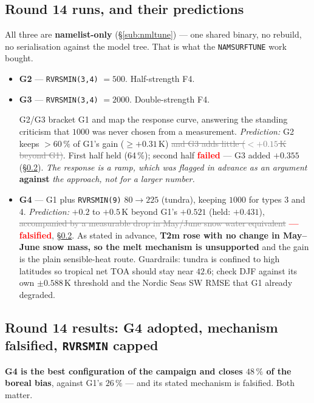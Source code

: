 \documentclass[10pt]{article}
\newcommand{\dead}[1]{\textcolor{gray}{\sout{#1}}}
\begin{document}
\subsection{Round 14 runs, and their predictions}\label{sub:r14runs}
All three are \textbf{namelist-only} (\S\ref{sub:nmltune}) --- one shared binary, no rebuild,
no serialisation against the model tree. That is what the \texttt{NAMSURFTUNE} work bought.

\begin{itemize}\itemsep3pt
\item \textbf{G2} --- \texttt{RVRSMIN(3,4)} $=500$. Half-strength F4.
\item \textbf{G3} --- \texttt{RVRSMIN(3,4)} $=2000$. Double-strength F4.

  G2/G3 bracket G1 and map the response curve, answering the standing criticism that $1000$
  was never chosen from a measurement. \emph{Prediction:} G2 keeps $>60\,\%$ of G1's gain
  ($\ge +0.31$\,K) \dead{and G3 adds little ($< +0.15$\,K beyond G1)}. First half held
  (64\,\%); second half \textcolor{red}{\textbf{failed}} --- G3 added $+0.355$
  (\S\ref{sub:r14res}). \emph{The response is a ramp, which was flagged in advance as an
  argument} \textbf{against} \emph{the approach, not for a larger number.}
\item \textbf{G4} --- G1 plus \texttt{RVRSMIN(9)} $80\to225$ (tundra), keeping $1000$ for
  types 3 and 4. \emph{Prediction:} $+0.2$ to $+0.5$\,K beyond G1's $+0.521$ (held: $+0.431$),
  \dead{accompanied by a measurable drop in May/June snow water equivalent}
  \textcolor{red}{\textbf{--- falsified}}, \S\ref{sub:r14res}. As stated in advance,
  \textbf{T2m rose with no change in May--June snow mass, so the melt mechanism is
  unsupported} and the gain is the plain sensible-heat route.
  Guardrails: tundra is confined to high latitudes so tropical net TOA should stay near
  $42.6$; check DJF against its own $\pm0.588$\,K threshold and the Nordic Seas SW RMSE that
  G1 already degraded.
\end{itemize}

\subsection{Round 14 results: G4 adopted, mechanism falsified, \texttt{RVRSMIN} capped}\label{sub:r14res}
\textbf{G4 is the best configuration of the campaign and closes $48\,\%$ of the boreal bias},
against G1's $26\,\%$ --- and its stated mechanism is falsified. Both matter.
\end{document}
